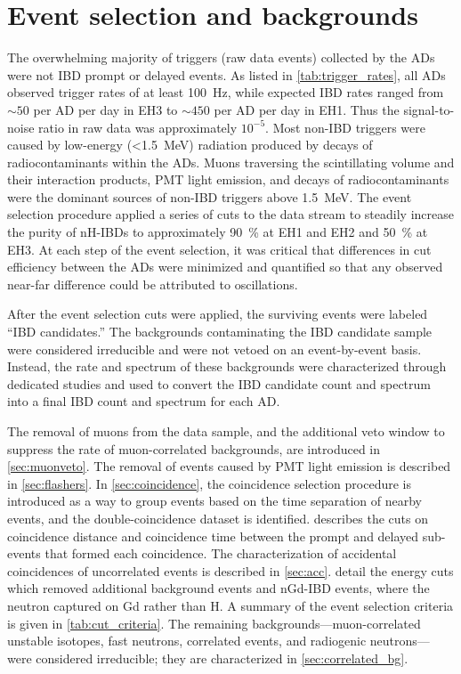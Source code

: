 \chapter{Event selection and backgrounds}
\label{ch:event_selection}

The overwhelming majority of triggers (raw data events) collected by the ADs
were not IBD prompt or delayed events.
As listed in \cref{tab:trigger_rates}, all ADs observed trigger rates
of at least \SI{100}{\Hz},
while expected IBD rates ranged from ${\sim}50$ per AD per day in EH3
to ${\sim}450$ per AD per day in EH1.
Thus the signal-to-noise ratio in raw data was approximately $10^{-5}$.
Most non-IBD triggers were caused by low-energy (\SI{<1.5}{\MeV}) radiation
produced by decays of radiocontaminants within the ADs.
Muons traversing the scintillating volume and their interaction products,
PMT light emission,
and decays of radiocontaminants
were the dominant sources of non-IBD triggers above \SI{1.5}{\MeV}.
The event selection procedure applied a series of cuts to the data stream
to steadily increase the purity of nH-IBDs
to approximately \SI{90}{\percent} at EH1 and EH2
and \SI{50}{\percent} at EH3.
At each step of the event selection, it was critical that
differences in cut efficiency between the ADs were
minimized and quantified so that any observed near-far difference
could be attributed to \nuebar{} oscillations.

After the event selection cuts were applied,
the surviving events were labeled ``IBD candidates.''
The backgrounds contaminating the IBD candidate sample
were considered irreducible and were not vetoed on an event-by-event basis.
Instead, the rate and spectrum of these backgrounds were characterized
through dedicated studies
and used to convert the IBD candidate count and spectrum
into a final IBD count and spectrum for each AD.

The removal of muons from the data sample, and the additional veto window
to suppress the rate of muon-correlated backgrounds,
are introduced in \cref{sec:muonveto}.
The removal of events caused by PMT light emission
is described in \cref{sec:flashers}.
In \cref{sec:coincidence}, the coincidence selection procedure
is introduced as a way to group events based on
the time separation of nearby events,
and the double-coincidence dataset is identified.
 describes the cuts on coincidence distance and coincidence time
between the prompt and delayed sub-events that formed each coincidence.
The characterization of
accidental coincidences of uncorrelated events
is described in \cref{sec:acc}.
 detail the energy cuts
which removed additional background events
and nGd-IBD events, where the neutron captured on Gd rather than H.
A summary of the event selection criteria is given in \cref{tab:cut_criteria}.
The remaining backgrounds---muon-correlated unstable isotopes,
fast neutrons, \amc{} correlated events, and radiogenic neutrons---%
were considered irreducible;
they are characterized in \cref{sec:correlated_bg}.

